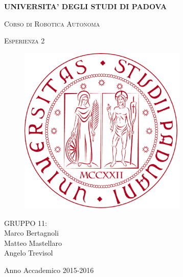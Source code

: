 \documentclass[english]{article}
\begin{document}
\begin{titlepage} 

\begin{center}
\begin{Large} \textbf{UNIVERSITA' DEGLI STUDI DI PADOVA} \\
 \end{Large} \vspace{1cm}

\begin{Large} \textsc{Corso di Robotica Autonoma }\end{Large}
\par\end{center}

\begin{center}
\begin{Large}\textsc{Esperienza 2}\\
 \end{Large}
\par\end{center}

\begin{center}
\vspace{2cm}
\begin{figure}[!htb]
\centering \includegraphics[width=8cm]{unipd}\\
 
\end{figure}

\par\end{center}

\begin{center}
\vspace{2cm}
 \begin{Large}
 GRUPPO 11: \\
 Marco Bertagnoli \\ 
 Matteo Mastellaro \\ 
 Angelo Trevisol\\
 \end{Large} \vspace{2cm}
 \begin{Large} Anno Accademico 2015-2016 \end{Large} 
\par\end{center}

\end{titlepage}
\end{document}
